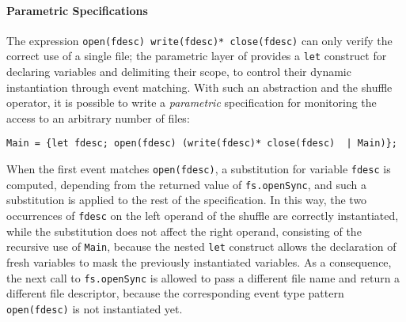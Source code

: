 \paragraph{Parametric Specifications}
The expression \lstinline{open(fdesc) write(fdesc)* close(fdesc)} can only verify the correct use of a single file;
the parametric layer of \rml provides a \lstinline{let} construct \cite{AnconaFM17} for declaring variables and delimiting their scope,
to control their dynamic instantiation through event matching.
With such an abstraction and the shuffle operator, it is possible to write a \emph{parametric} specification
for monitoring the access to an arbitrary number of files:
\begin{lstlisting}[basicstyle=\ttfamily\footnotesize]
Main = {let fdesc; open(fdesc) (write(fdesc)* close(fdesc)  | Main)};
\end{lstlisting}
When the first event matches \lstinline{open(fdesc)}, a substitution for variable 
\lstinline{fdesc} is computed, depending from the returned value of \lstinline{fs.openSync}, and such a substitution is applied
to the rest of the specification.
In this way, the two occurrences of \lstinline{fdesc} on the left operand of the shuffle are correctly
instantiated, while the substitution does not affect the right operand, consisting of the recursive
use of \lstinline{Main}, because the nested \lstinline{let} construct allows the declaration of fresh
variables to mask the previously instantiated variables. As a consequence, the
next call to \lstinline{fs.openSync} is allowed to pass a different file name and return a
different file descriptor, because the corresponding event type pattern \lstinline{open(fdesc)}
is not instantiated yet.


